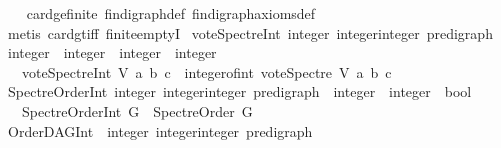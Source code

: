 \begin{isabellebody}
\isadelimproof
\ \ %
\endisadelimproof
%
\isatagproof
{}\isamarkupfalse%
\ card{\isacharunderscore}{\kern0pt}ge{\isacharunderscore}{\kern0pt}{}{\isacharunderscore}{\kern0pt}finite\ fin{\isacharunderscore}{\kern0pt}digraph{\isacharunderscore}{\kern0pt}def\ fin{\isacharunderscore}{\kern0pt}digraph{\isacharunderscore}{\kern0pt}axioms{\isacharunderscore}{\kern0pt}def\isanewline
\ \ \isamarkupfalse%
\ {\isacharparenleft}{\kern0pt}metis\ card{\isacharunderscore}{\kern0pt}gt{\isacharunderscore}{\kern0pt}{}{\isacharunderscore}{\kern0pt}iff\ finite{\isachardot}{\kern0pt}emptyI{\isacharparenright}{\kern0pt}%
\endisatagproof
{\isafoldproof}%
%
\isadelimproof
\isanewline
%
\endisadelimproof
\isanewline
\isanewline
{}\isamarkupfalse%
\ vote{\isacharunderscore}{\kern0pt}Spectre{\isacharunderscore}{\kern0pt}Int{\isacharcolon}{\kern0pt}{\isacharcolon}{\kern0pt}\ {\isachardoublequoteopen}{\isacharparenleft}{\kern0pt}integer{\isacharcomma}{\kern0pt}\ integer{\isasymtimes}integer{\isacharparenright}{\kern0pt}\ pre{\isacharunderscore}{\kern0pt}digraph\ {\isasymRightarrow}\isanewline
\ integer\ {\isasymRightarrow}\ integer\ {\isasymRightarrow}\ integer\ {\isasymRightarrow}\ integer{\isachardoublequoteclose}\isanewline
\ \ \ {\isachardoublequoteopen}vote{\isacharunderscore}{\kern0pt}Spectre{\isacharunderscore}{\kern0pt}Int\ V\ a\ b\ c\ {\isacharequal}{\kern0pt}\ integer{\isacharunderscore}{\kern0pt}of{\isacharunderscore}{\kern0pt}int\ {\isacharparenleft}{\kern0pt}vote{\isacharunderscore}{\kern0pt}Spectre\ V\ a\ b\ c{\isacharparenright}{\kern0pt}{\isachardoublequoteclose}\isanewline
\isanewline
{}\isamarkupfalse%
\ SpectreOrder{\isacharunderscore}{\kern0pt}Int{\isacharcolon}{\kern0pt}{\isacharcolon}{\kern0pt}\ {\isachardoublequoteopen}{\isacharparenleft}{\kern0pt}integer{\isacharcomma}{\kern0pt}\ integer{\isasymtimes}integer{\isacharparenright}{\kern0pt}\ pre{\isacharunderscore}{\kern0pt}digraph\ {\isasymRightarrow}\ integer\ {\isasymRightarrow}\ integer\ {\isasymRightarrow}\ bool{\isachardoublequoteclose}\isanewline
\ \ \ {\isachardoublequoteopen}SpectreOrder{\isacharunderscore}{\kern0pt}Int\ G\ {\isacharequal}{\kern0pt}\ Spectre{\isacharunderscore}{\kern0pt}Order\ G{\isachardoublequoteclose}\isanewline
\isanewline
{}\isamarkupfalse%
\ OrderDAG{\isacharunderscore}{\kern0pt}Int{\isacharcolon}{\kern0pt}{\isacharcolon}{\kern0pt}\ \ {\isachardoublequoteopen}{\isacharparenleft}{\kern0pt}integer{\isacharcomma}{\kern0pt}\ integer{\isasymtimes}integer{\isacharparenright}{\kern0pt}\ pre{\isacharunderscore}{\kern0pt}digraph\ {\isasymRightarrow}\isanewline

\end{isabellebody}
